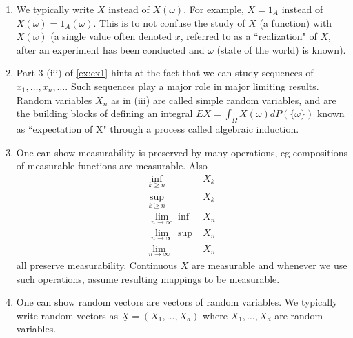 \documentclass{article}
\begin{document}
	\begin{myrem}{}{}
	    \begin{enumerate}
	        \item We typically write $X$ instead of $X(\omega)$. For example, $X=1_A$ instead of $X(\omega)=1_A(\omega)$. This is to not confuse the study of $X$ (a function) with $X(\omega)$ (a single value often denoted $x$, referred to as a ``realization" of $X$, after an experiment has been conducted and $\omega$ (state of the world) is known).
	        
	        \item Part 3 (iii) of \ref{ex:ex1} hints at the fact that we can study sequences of $x_1, \dots, x_n, \dots$. Such sequences play a major role in major limiting results.\\
	        
	        Random variables $X_n$ as in (iii) are called simple random variables, and are the building blocks of defining an integral $EX=\int_\Omega X(\omega)dP(\{\omega\})$ known as ``expectation of X" through a process called algebraic induction.
	        
	        \item One can show measurability is preserved by many operations, eg compositions of measurable functions are measurable. Also 
	        \begin{align*}
	        	\inf_{k\geq n}&X_k\\
	        	\sup_{k\geq n}&X_k\\
	        	\lim_{n\to\infty}\inf &X_n\\
	        	\lim_{n\to\infty}\sup &X_n\\
	        	\lim_{n\to\infty}&X_n
	       	\end{align*} all preserve measurability. Continuous $X$ are measurable and whenever we use such operations, assume resulting mappings to be measurable.
	       	
	       	\item One can show random vectors are vectors of random variables. We typically write random vectors as $\underline{X}=(X_1, \dots, X_d)$ where $X_1, \dots, X_d$ are random variables.
	    \end{enumerate}
	\end{myrem}
	
\end{document}
